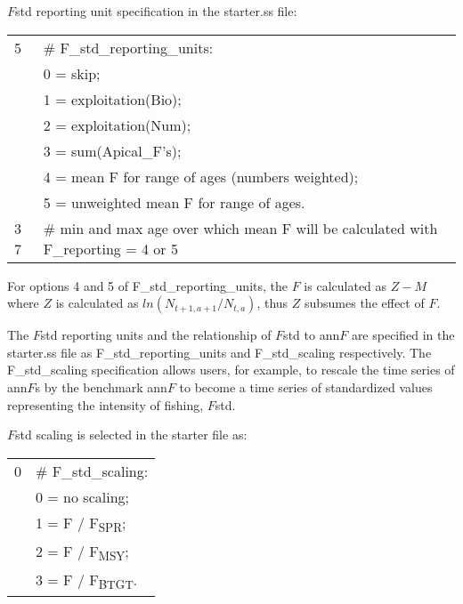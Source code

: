 
$F$std reporting unit specification in the starter.ss file:
\begin{center}
	\begin{longtable}{p{2cm} p{12cm}}
		\hline
		5 & \# F\_std\_reporting\_units: \Tstrut\\
		  & 0 = skip; \\
		  & 1 = exploitation(Bio); \\
		  & 2 = exploitation(Num); \\ 
		  & 3 = sum(Apical\_F's); \\
		  & 4 = mean F for range of ages (numbers weighted); \\
		  & 5 = unweighted mean F for range of ages. \Bstrut\\
		\hline
		3 7 & \# min and max age over which mean F will be calculated with F\_reporting = 4 or 5 \Tstrut\Bstrut\\
		\hline
	\end{longtable}
\end{center}

For options 4 and 5 of F\_std\_reporting\_units, the $F$ is calculated as $Z-M$ where $Z$ is calculated as $ln(N_{t+1,a+1}/N_{t,a})$, thus $Z$ subsumes the effect of $F$.

The $F$std reporting units and the relationship of $F$std to ann$F$ are specified in the starter.ss file as F\_std\_reporting\_units and F\_std\_scaling respectively. The F\_std\_scaling specification allows users, for example, to rescale the time series of ann$F$s by the benchmark ann$F$ to become a time series of standardized values representing the intensity of fishing, $F$std.

$F$std scaling is selected in the starter file as:
\begin{center}
	\begin{longtable}{p{2cm} p{12cm}}
		\hline
		0 & \# F\_std\_scaling: \Tstrut\\
		& 0 = no scaling; \\
		& 1 = F / F\textsubscript{SPR}; \\ 
		& 2 = F / F\textsubscript{MSY}; \\
		& 3 = F / F\textsubscript{BTGT}.\Bstrut\\
		\hline
	\end{longtable}
\end{center}


